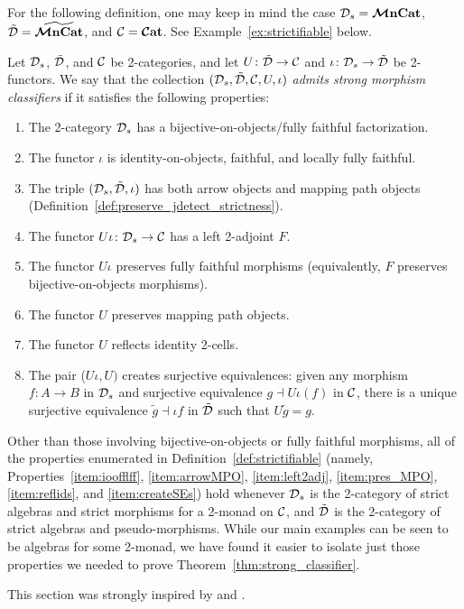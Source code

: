 \documentclass[11pt,oneside,article]{memoir}
\begin{document}
For the following definition, one may keep in mind the case $\mathcal{D}_s=\bm{\mathcal{M}}\mathbf{nCat}$,
$\tilde{\mathcal{D}}=\widetilde{\bm{\mathcal{M}}\mathbf{nCat}}$, and $\mathcal{C}=\bm{\mathcal{C}}\mathbf{at}$. See Example~\ref{ex:strictifiable} below.

\begin{definition}
    \label{def:strictifiable}
  Let $\mathcal{D}_s$, $\tilde{\mathcal{D}}$, and $\mathcal{C}$ be 2-categories, and let $U\colon\tilde{\mathcal{D}}\to\mathcal{C}$
  and $\iota\colon\mathcal{D}_s\to\tilde{\mathcal{D}}$ be 2-functors. We say that the collection
  $(\mathcal{D}_s,\tilde{\mathcal{D}},\mathcal{C},U,\iota)$ \emph{admits strong morphism classifiers} if it satisfies
  the following properties:
  \begin{enumerate}
    \item\label{item:boff}
      The 2-category $\mathcal{D}_s$ has a bijective-on-objects/fully faithful factorization.
    \item\label{item:ioofflff}
      The functor $\iota$ is identity-on-objects, faithful, and locally fully faithful.
    \item\label{item:arrowMPO}
      The triple $(\mathcal{D}_s,\tilde{\mathcal{D}},\iota)$ has both arrow objects and mapping path objects
      (Definition~\ref{def:preserve_jdetect_strictness}).
    \item\label{item:left2adj}
      The functor $U\iota\colon\mathcal{D}_s\to\mathcal{C}$ has a left 2-adjoint $F$.
    \item\label{item:pres_ff}
      The functor $U\iota$ preserves fully faithful morphisms (equivalently, $F$ preserves
      bijective-on-objects morphisms).
    \item\label{item:pres_MPO}
      The functor $U$ preserves mapping path objects.
    \item\label{item:reflids}
      The functor $U$ reflects identity 2-cells.
    \item\label{item:createSEs}
      The pair ($U\iota,U)$ creates surjective equivalences: given any morphism $f\colon A\to B$ in
      $\mathcal{D}_s$ and surjective equivalence $g\dashv U\iota(f)$ in $\mathcal{C}$, there is a unique
      surjective equivalence $\tilde{g}\dashv\iota f$ in $\tilde{\mathcal{D}}$ such that $U\tilde{g}=g$.
  \end{enumerate}
\end{definition}

\begin{remark}
  Other than those involving bijective-on-objects or fully faithful morphisms, all of the properties
  enumerated in Definition~\ref{def:strictifiable} (namely, Properties~\ref{item:ioofflff},
  \ref{item:arrowMPO}, \ref{item:left2adj}, \ref{item:pres_MPO}, \ref{item:reflids}, and
  \ref{item:createSEs}) hold whenever $\mathcal{D}_s$ is the 2-category of strict algebras and strict
  morphisms for a 2-monad on $\mathcal{C}$, and $\tilde{\mathcal{D}}$ is the 2-category of strict algebras and
  pseudo-morphisms. While our main examples can be seen to be algebras for some 2-monad, we have
  found it easier to isolate just those properties we needed to prove
  Theorem~\ref{thm:strong_classifier}.

  This section was strongly inspired by \cite{Bourke} and \cite{LackHomotopy}.
\end{remark}
\end{document}
